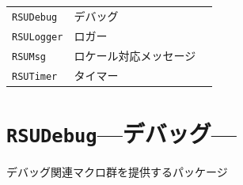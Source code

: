 \section{\DocStrTitlePackageListInCategory}
\begin{center}
\begin{xltabular}{\textwidth}{|p{2truecm}|X|p{2truecm}|}
\hline
\thead{\DocStrHeaderPackageName}&\thead{\DocStrHeaderPackagePurpose}&\thead{\DocStrRefto}\\
\hline
\hline
\texttt{RSUDebug}&デバッグ&\\
\hline
\texttt{RSULogger}&ロガー&\\
\hline
\texttt{RSUMsg}&ロケール対応メッセージ&\\
\hline
\texttt{RSUTimer}&タイマー&\\
\hline
\end{xltabular}
\end{center}
\section{\texttt{RSUDebug}\;---\;デバッグ\;---}\label{sec:RSUDebug}
デバッグ関連マクロ群を提供するパッケージ
